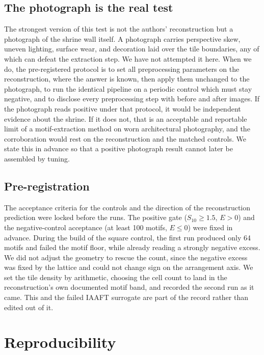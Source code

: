 \documentclass[11pt]{article}
\begin{document}
\subsection{The photograph is the real test}

The strongest version of this test is not the authors' reconstruction but a
photograph of the shrine wall itself. A photograph carries perspective skew,
uneven lighting, surface wear, and decoration laid over the tile boundaries, any
of which can defeat the extraction step. We have not attempted it here. When we
do, the pre-registered protocol is to set all preprocessing parameters on the
reconstruction, where the answer is known, then apply them unchanged to the
photograph, to run the identical pipeline on a periodic control which must stay
negative, and to disclose every preprocessing step with before and after images.
If the photograph reads positive under that protocol, it would be independent
evidence about the shrine. If it does not, that is an acceptable and reportable
limit of a motif-extraction method on worn architectural photography, and the
corroboration would rest on the reconstruction and the matched controls. We
state this in advance so that a positive photograph result cannot later be
assembled by tuning.

\subsection{Pre-registration}

The acceptance criteria for the controls and the direction of the reconstruction
prediction were locked before the runs. The positive gate ($S_{10} \geq 1.5$,
$E > 0$) and the negative-control acceptance (at least 100 motifs, $E \leq 0$)
were fixed in advance. During the build of the square control, the first run
produced only 64 motifs and failed the motif floor, while already reading a
strongly negative excess. We did not adjust the geometry to rescue the count,
since the negative excess was fixed by the lattice and could not change sign on
the arrangement axis. We set the tile density by arithmetic, choosing the cell
count to land in the reconstruction's own documented motif band, and recorded
the second run as it came. This and the failed IAAFT surrogate are part of the
record rather than edited out of it.

\section{Reproducibility}
\end{document}
